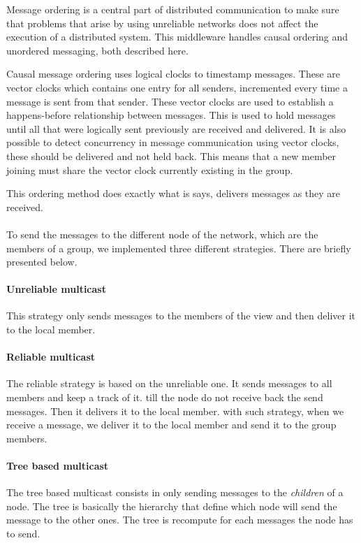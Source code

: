 
	Message ordering is a central part of distributed communication to make sure that problems that arise by using unreliable networks does not affect the execution of a distributed system.
	This middleware handles causal ordering and unordered messaging, both described here.

		Causal message ordering uses logical clocks to timestamp messages.
		These are vector clocks which contains one entry for all senders, incremented every time a message is sent from that sender.
		These vector clocks are used to establish a happens-before relationship between messages.
		This is used to hold messages until all that were logically sent previously are received and delivered.
		It is also possible to detect concurrency in message communication using vector clocks, these should be delivered and not held back.
		This means that a new member joining must share the vector clock currently existing in the group.

		This ordering method does exactly what is says, delivers messages as they are received.


\paragraph{}{
    To send the messages to the different node of the network,
 which are the members of a group, we implemented three different
 strategies. There are briefly presented below.
}

\paragraph{Unreliable multicast}{
    This strategy only sends messages to the members of the view
 and then deliver it to the local member.
 }

\paragraph{Reliable multicast}{
    The reliable strategy is based on the unreliable one. It
 sends messages to all members and keep a track of it. till
 the node do not receive back the send messages. Then it delivers
 it to the local member. with such strategy, when we receive a
 message, we deliver it to the local member and send it to the
 group members.
}

\paragraph{Tree based multicast}{
    The tree based multicast consists in only sending
 messages to the \textit{children} of a node. The
 tree is basically the hierarchy that define which node
 will send the message to the other ones. The tree is
 recompute for each messages the node has to send.
}

